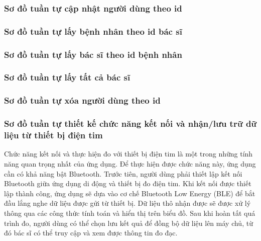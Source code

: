 \subsubsection{Sơ đồ tuần tự cập nhật người dùng theo id}

\subsubsection{Sơ đồ tuần tự lấy bệnh nhân theo id bác sĩ}

\subsubsection{Sơ đồ tuần tự lấy bác sĩ theo id bệnh nhân}

\subsubsection{Sơ đồ tuần tự lấy tất cả bác sĩ}

\subsubsection{Sơ đồ tuần tự xóa người dùng theo id}

\subsubsection{Sơ đồ tuần tự thiết kế chức năng kết nối và nhận/lưu trữ dữ liệu từ thiết bị điện tim}
Chức năng kết nối và thực hiện đo với thiết bị điện tim là một trong những tính năng quan trọng nhất của ứng dụng. Để thực hiện được chức năng này, ứng dụng cần có khả năng bật Bluetooth. Trước tiên, người dùng phải thiết lập kết nối Bluetooth giữa ứng dụng di động và thiết bị đo điện tim. Khi kết nối được thiết lập thành công, ứng dụng sẽ dựa vào cơ chế Bluetooth Low Energy (BLE) để bắt đầu lắng nghe dữ liệu được gửi từ thiết bị. Dữ liệu thô nhận được sẽ được xử lý thông qua các công thức tính toán và hiển thị trên biểu đồ. Sau khi hoàn tất quá trình đo, người dùng có thể chọn lưu kết quả để đồng bộ dữ liệu lên máy chủ, từ đó bác sĩ có thể truy cập và xem được thông tin đo đạc.


